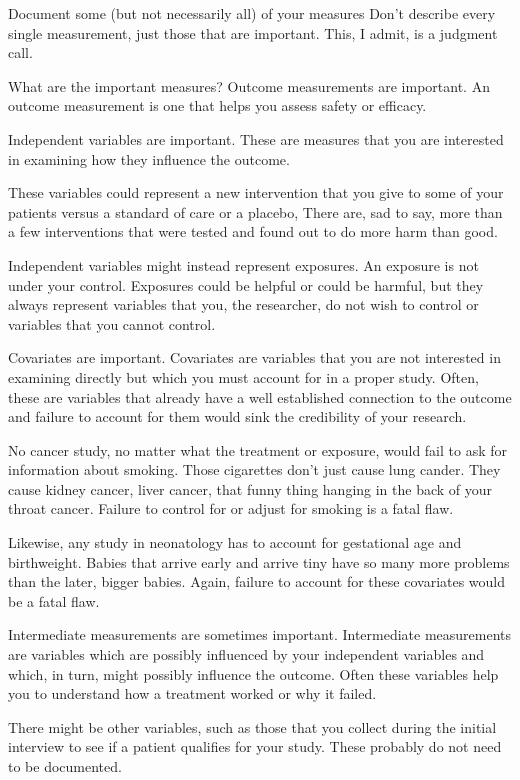 \documentclass[
  letterpaper,
  DIV=11,
  numbers=noendperiod]{scrreprt}
\begin{document}
\begin{tcolorbox}
Document some (but not necessarily all) of your measures Don't describe
every single measurement, just those that are important. This, I admit,
is a judgment call.

What are the important measures? Outcome measurements are important. An
outcome measurement is one that helps you assess safety or efficacy.

Independent variables are important. These are measures that you are
interested in examining how they influence the outcome.

These variables could represent a new intervention that you give to some
of your patients versus a standard of care or a placebo, There are, sad
to say, more than a few interventions that were tested and found out to
do more harm than good.

Independent variables might instead represent exposures. An exposure is
not under your control. Exposures could be helpful or could be harmful,
but they always represent variables that you, the researcher, do not
wish to control or variables that you cannot control.

Covariates are important. Covariates are variables that you are not
interested in examining directly but which you must account for in a
proper study. Often, these are variables that already have a well
established connection to the outcome and failure to account for them
would sink the credibility of your research.

No cancer study, no matter what the treatment or exposure, would fail to
ask for information about smoking. Those cigarettes don't just cause
lung cander. They cause kidney cancer, liver cancer, that funny thing
hanging in the back of your throat cancer. Failure to control for or
adjust for smoking is a fatal flaw.

Likewise, any study in neonatology has to account for gestational age
and birthweight. Babies that arrive early and arrive tiny have so many
more problems than the later, bigger babies. Again, failure to account
for these covariates would be a fatal flaw.

Intermediate measurements are sometimes important. Intermediate
measurements are variables which are possibly influenced by your
independent variables and which, in turn, might possibly influence the
outcome. Often these variables help you to understand how a treatment
worked or why it failed.

There might be other variables, such as those that you collect during
the initial interview to see if a patient qualifies for your study.
These probably do not need to be documented.


\end{tcolorbox}
\end{document}
